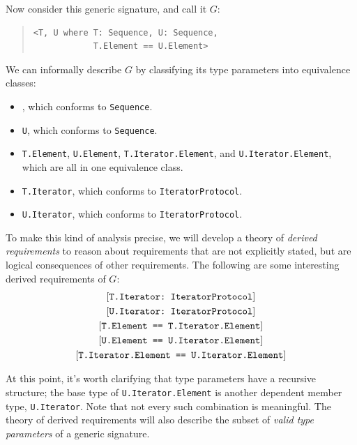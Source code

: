 \documentclass[../generics]{subfiles}
\begin{document}
Now consider this generic signature, and call it $G$:
\begin{quote}
\begin{verbatim}
<T, U where T: Sequence, U: Sequence,
            T.Element == U.Element>
\end{verbatim}
\end{quote}
We can informally describe $G$ by classifying its type parameters into equivalence classes:
\begin{itemize}
\item \tT, which conforms to \texttt{Sequence}.
\item \texttt{U}, which conforms to \texttt{Sequence}.
\item \texttt{T.Element}, \texttt{U.Element}, \texttt{T.Iterator.Element}, and \texttt{U.Iterator.Element}, which are all in one equivalence class.
\item \texttt{T.Iterator}, which conforms to \texttt{IteratorProtocol}.
\item \texttt{U.Iterator}, which conforms to \texttt{IteratorProtocol}.
\end{itemize}
To make this kind of analysis precise, we will develop a theory of \emph{derived requirements} to reason about requirements that are not explicitly stated, but are logical consequences of other requirements. The following are some interesting derived requirements of $G$:
\begin{gather*}
\ConfReq{T.Iterator}{IteratorProtocol}\\
\ConfReq{U.Iterator}{IteratorProtocol}\\
\SameReq{T.Element}{T.Iterator.Element}\\
\SameReq{U.Element}{U.Iterator.Element}\\
\SameReq{T.Iterator.Element}{U.Iterator.Element}
\end{gather*}

At this point, it's worth clarifying that type parameters have a recursive structure; the base type of \texttt{U.Iterator.Element} is another dependent member type, \texttt{U.Iterator}. Note that not every such combination is meaningful. The theory of derived requirements will also describe the subset of \emph{valid type parameters} of a generic signature.
\end{document}
